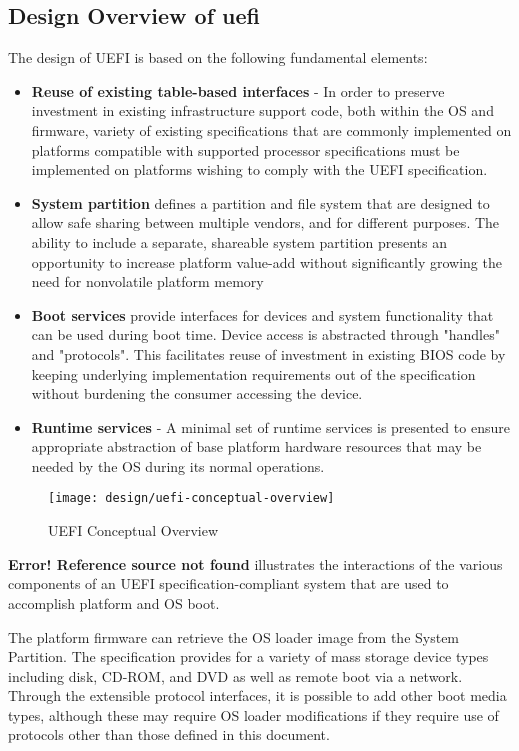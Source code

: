 \subsection{Design Overview of \gls{uefi}}
The design of UEFI is based on the following fundamental elements:

\begin{itemize}
	\item \textbf{Reuse of existing table-based interfaces} - In order to preserve investment in existing infrastructure support code, both within the OS and firmware, variety of existing specifications that are commonly implemented on platforms compatible with supported processor specifications must be implemented on platforms wishing to comply with the UEFI specification.
	\item \textbf{System partition} defines a partition and file system that are designed to allow safe sharing between multiple vendors, and for different purposes. The ability to include a separate, shareable system partition presents an opportunity to increase platform value-add without significantly growing the need for nonvolatile platform memory
	\item \textbf{Boot services} provide interfaces for devices and system functionality that
	can be used during boot time. Device access is abstracted through "handles" and
	"protocols". This facilitates reuse of investment in existing BIOS code by keeping
	underlying implementation requirements out of the specification without burdening the
	consumer accessing the device.
	\item \textbf{Runtime services} - A minimal set of runtime services is presented to ensure appropriate	abstraction of base platform hardware resources that may be needed by the OS during its	normal operations.
\end{itemize}

\begin{figure}[h]
	\centering
	\texttt{[image: design/uefi-conceptual-overview]}
	\caption{UEFI Conceptual Overview}\label{fig:design-uefi-conceptual-overview}
\end{figure}

\textbf{Error! Reference source not found} illustrates the interactions of the various components of an UEFI specification-compliant system that are used to accomplish platform and OS boot.

The platform firmware can retrieve the OS loader image from the System Partition. The
specification provides for a variety of mass storage device types including disk, CD-ROM, and
DVD as well as remote boot via a network. Through the extensible protocol interfaces, it is possible
to add other boot media types, although these may require OS loader modifications if they require
use of protocols other than those defined in this document.

